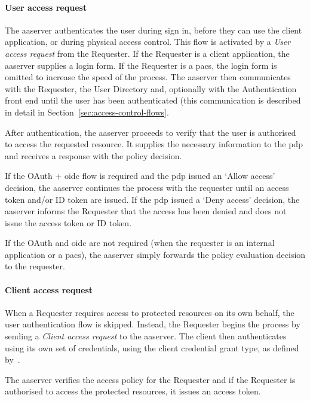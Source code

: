 \paragraph{User access request}
The \acrshort{aaserver} authenticates the user during sign in, before they can use the client application, or during physical access control. This flow is activated by a \textit{User access request} from the Requester. If the Requester is a client application, the \acrshort{aaserver} supplies a login form. If the Requester is a \acrshort{pacs}, the login form is omitted to increase the speed of the process. The \acrshort{aaserver} then communicates with the Requester, the User Directory and, optionally with the Authentication front end until the user has been authenticated (this communication is described in detail in Section~\ref{sec:access-control-flows}.

After authentication, the \acrshort{aaserver} proceeds to verify that the user is authorised to access the requested resource. It supplies the necessary information to the \acrshort{pdp} and receives a response with the policy decision.

If the OAuth + \acrshort{oidc} flow is required and the \acrshort{pdp} issued an `Allow access' decision, the \acrshort{aaserver} continues the process with the requester until an access token and/or ID token are issued. If the \acrshort{pdp} issued a `Deny access' decision, the \acrshort{aaserver} informs the Requester that the access has been denied and does not issue the access token or ID token. 

If the OAuth and \acrshort{oidc} are not required (when the requester is an internal application or a \acrshort{pacs}), the \acrshort{aaserver} simply forwards the policy evaluation decision to the requester.

\paragraph{Client access request}
When a Requester requires access to protected resources on its own behalf, the user authentication flow is skipped. Instead, the Requester begins the process by sending a \textit{Client access request} to the \acrshort{aaserver}. The client then authenticates using its own set of credentials, using the client credential grant type, as defined by~\cite{Hardt2012TheFramework}. 

The \acrshort{aaserver} verifies the access policy for the Requester and if the Requester is authorised to access the protected resources, it issues an access token.

